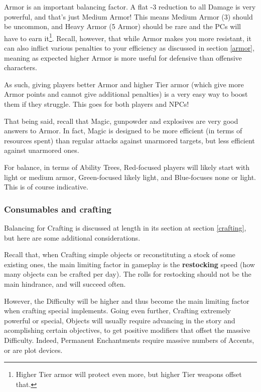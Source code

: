Armor is an important balancing factor. A flat -3 reduction to all Damage is very powerful, and that's just Medium Armor! This means Medium Armor (3) should be uncommon, and Heavy Armor (5 Armor) should be rare and the PCs will have to earn it\footnote{Higher Tier armor will protect even more, but higher Tier weapons offset that.}. Recall, however, that while Armor makes you more resistant, it can also inflict various penalties to your efficiency as discussed in section \ref{armor}, meaning as expected higher Armor is more useful for defensive than offensive characters.

As such, giving players better Armor and higher Tier armor (which give more Armor points and cannot give additional penalties) is a very easy way to boost them if they struggle. This goes for both players and NPCs!

That being said, recall that Magic, gunpowder and explosives are very good answers to Armor. In fact, Magic is designed to be more efficient (in terms of resources spent) than regular attacks against unarmored targets, but less efficient against unarmored ones.

For balance, in terms of Ability Trees, Red-focused players will likely start with light or medium armor, Green-focused likely light, and Blue-focuses none or light. This is of course indicative.


\subsubsection{Consumables and crafting}

Balancing for Crafting is discussed at length in its section at section \ref{crafting}, but here are some additional considerations.

Recall that, when Crafting simple objects or reconstituting a stock of some existing ones, the main limiting factor in gameplay is the \textbf{restocking} speed (how many objects can be crafted per day). The rolls for restocking should not be the main hindrance, and will succeed often.

However, the Difficulty will be higher and thus become the main limiting factor when crafting special implements. Going even further, Crafting extremely powerful or special, Objects will usually require advancing in the story and acomplishing certain objectives, to get positive modifiers that offset the massive Difficulty. Indeed, Permanent Enchantments require massive numbers of Accents, or are plot devices.

